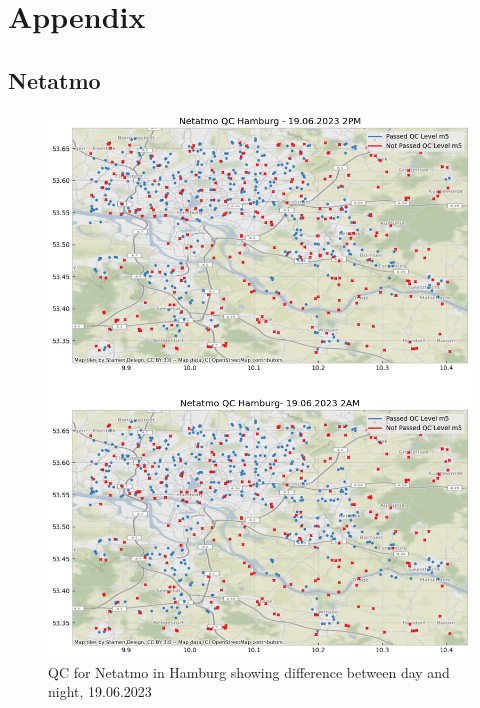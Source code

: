 \chapter{Appendix}

\section{Netatmo}
\label{appendix: netatmo}

\begin{figure}[ht]
    \centering
    \includegraphics[width=.8\textwidth]{images/qc_hamburg_netatmo_june_before_after.png}
    \caption{QC for Netatmo in Hamburg showing difference between day and night, 19.06.2023}
    \label{fig:qc netatmo hamburg before after m5}
\end{figure}

